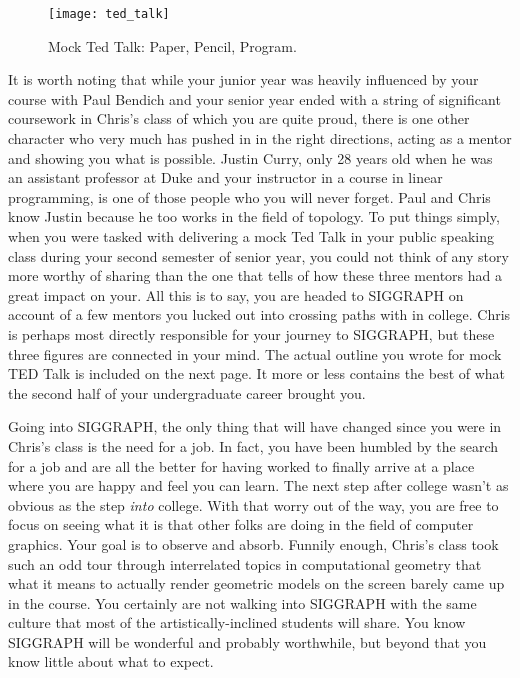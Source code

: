 \documentclass[../main.tex]{subfiles}
\begin{document}
\begin{figure}[h!]
	\centering
	\texttt{[image: ted\_talk]}
	\caption*{Mock Ted Talk: Paper, Pencil, Program.}
\end{figure}

It is worth noting that while your junior year was heavily influenced by your course with Paul Bendich and your senior year ended with a string of significant coursework in Chris's class of which you are quite proud, there is one other character who very much has pushed in in the right directions, acting as a mentor and showing you what is possible. Justin Curry, only 28 years old when he was an assistant professor at Duke and your instructor in a course in linear programming, is one of those people who you will never forget. Paul and Chris know Justin because he too works in the field of topology. To put things simply, when you were tasked with delivering a mock Ted Talk in your public speaking class during your second semester of senior year, you could not think of any story more worthy of sharing than the one that tells of how these three mentors had a great impact on your. All this is to say, you are headed to SIGGRAPH on account of a few mentors you lucked out into crossing paths with in college. Chris is perhaps most directly responsible for your journey to SIGGRAPH, but these three figures are connected in your mind. The actual outline you wrote for mock TED Talk is included on the next page. It more or less contains the best of what the second half of your undergraduate career brought you.

Going into SIGGRAPH, the only thing that will have changed since you were in Chris's class is the need for a job. In fact, you have been humbled by the search for a job and are all the better for having worked to finally arrive at a place where you are happy and feel you can learn. The next step after college wasn't as obvious as the step \textit{into} college. With that worry out of the way, you are free to focus on seeing what it is that other folks are doing in the field of computer graphics. Your goal is to observe and absorb. Funnily enough, Chris's class took such an odd tour through interrelated topics in computational geometry that what it means to actually render geometric models on the screen barely came up in the course. You certainly are not walking into SIGGRAPH with the same culture that most of the artistically-inclined students will share. You know SIGGRAPH will be wonderful and probably worthwhile, but beyond that you know little about what to expect.


\end{document}
